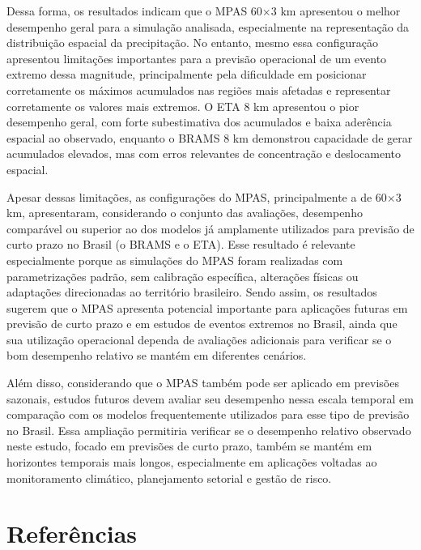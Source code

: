 \documentclass[12pt,a4paper,oneside]{book}
\begin{document}
Dessa forma, os resultados indicam que o MPAS 60$\times$3 km apresentou o melhor desempenho geral para a simulação analisada, especialmente na representação da distribuição espacial da precipitação. No entanto, mesmo essa configuração apresentou limitações importantes para a previsão operacional de um evento extremo dessa magnitude, principalmente pela dificuldade em posicionar corretamente os máximos acumulados nas regiões mais afetadas e representar corretamente os valores mais extremos. O ETA 8 km apresentou o pior desempenho geral, com forte subestimativa dos acumulados e baixa aderência espacial ao observado, enquanto o BRAMS 8 km demonstrou capacidade de gerar acumulados elevados, mas com erros relevantes de concentração e deslocamento espacial.

Apesar dessas limitações, as configurações do MPAS, principalmente a de 60$\times$3 km, apresentaram, considerando o conjunto das avaliações, desempenho comparável ou superior ao dos modelos já amplamente utilizados para previsão de curto prazo no Brasil (o BRAMS e o ETA). Esse resultado é relevante especialmente porque as simulações do MPAS foram realizadas com parametrizações padrão, sem calibração específica, alterações físicas ou adaptações direcionadas ao território brasileiro. Sendo assim, os resultados sugerem que o MPAS apresenta potencial importante para aplicações futuras em previsão de curto prazo e em estudos de eventos extremos no Brasil, ainda que sua utilização operacional dependa de avaliações adicionais para verificar se o bom desempenho relativo se mantém em diferentes cenários.

Além disso, considerando que o MPAS também pode ser aplicado em previsões sazonais, estudos futuros devem avaliar seu desempenho nessa escala temporal em comparação com os modelos frequentemente utilizados para esse tipo de previsão no Brasil. Essa ampliação permitiria verificar se o desempenho relativo observado neste estudo, focado em previsões de curto prazo, também se mantém em horizontes temporais mais longos, especialmente em aplicações voltadas ao monitoramento climático, planejamento setorial e gestão de risco.

\chapter*{Referências}
\end{document}
